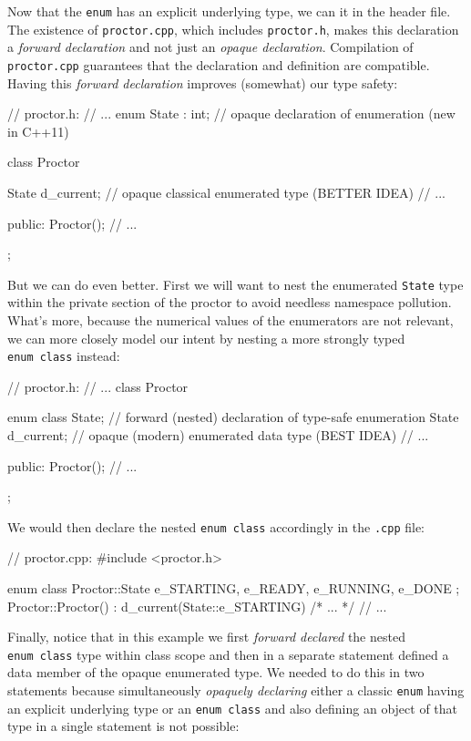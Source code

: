 \noindent Now that the  \lstinline!enum! has an explicit
underlying type, we can  it in the header file.
The existence of \lstinline!proctor.cpp!, which includes
\lstinline!proctor.h!, makes this declaration a \emph{forward declaration}
and not just an \emph{opaque declaration}. Compilation of
\lstinline!proctor.cpp! guarantees that the declaration and definition are
compatible. Having this \emph{forward declaration} improves (somewhat)
our type safety:

\begin{emcppslisting}[emcppsbatch=e4]
// proctor.h:
// ...
enum State : int;  // opaque declaration of enumeration (new in C++11)

class Proctor
{
    State d_current;  // opaque classical enumerated type (BETTER IDEA)
    // ...

public:
    Proctor();
    // ...
};
\end{emcppslisting}

\noindent But we can do even better. First we will want to nest the enumerated
\lstinline!State! type within the private section of the proctor to avoid
needless namespace pollution. What's more, because the numerical values
of the enumerators are not relevant, we can more closely model our
intent by nesting a more strongly typed \lstinline!enum!~\lstinline!class! instead:

\begin{emcppslisting}[emcppsbatch=e5]
// proctor.h:
// ...
class Proctor
{
    enum class State;  // forward (nested) declaration of type-safe enumeration
    State d_current;   // opaque (modern) enumerated data type (BEST IDEA)
    // ...

public:
    Proctor();
    // ...
};
\end{emcppslisting}

\noindent We would then declare the nested
\lstinline!enum!~\lstinline!class! %
accordingly in the
\lstinline!.cpp! file:

\begin{emcppslisting}[emcppsbatch=e5]
// proctor.cpp:
#include <proctor.h>

enum class Proctor::State { e_STARTING, e_READY, e_RUNNING, e_DONE };
Proctor::Proctor() : d_current(State::e_STARTING) { /* ... */ }
// ...
\end{emcppslisting}

\noindent Finally, notice that in this example we first \emph{forward declared}
the nested \lstinline!enum!~\lstinline!class! type within class scope and
then in a separate statement defined a data member of the opaque
enumerated type. We needed to do this in two statements because
simultaneously \emph{opaquely declaring} either a classic \lstinline!enum!
having an explicit underlying type %
or an
\lstinline!enum!~\lstinline!class! %
and also defining an object
of that type in a single statement is not possible:

